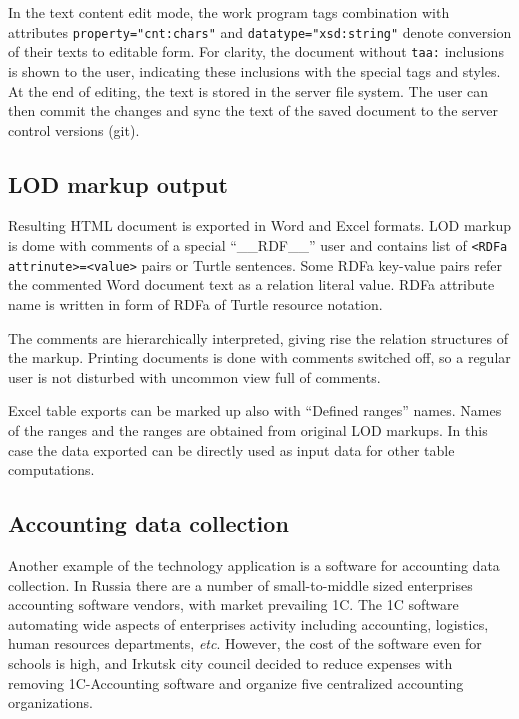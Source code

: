 \documentclass[conference,a4paper]{IEEEtran}
\begin{document}
In the text content edit mode, the work program tags combination with attributes \texttt{property="cnt:chars"} and \texttt{datatype="xsd:string"} denote conversion of their texts to editable form.  For clarity, the document without \texttt{taa:} inclusions is shown to the user, indicating these inclusions with the special tags and styles.  At the end of editing, the text is stored in the server file system.  The user can then commit the changes and sync the text of the saved document to the server control versions (git).

\subsection{LOD markup output}
\label{sec:lod-out}

Resulting HTML document is exported in Word and Excel formats.  LOD markup is dome with comments of a special ``\_\_RDF\_\_'' user and contains list of \texttt{<RDFa attrinute>=<value>} pairs or Turtle sentences.  Some RDFa key-value pairs refer the commented Word document text as a relation literal value.  RDFa attribute name is written in form of RDFa of Turtle resource notation.

The comments are hierarchically interpreted, giving rise the relation structures of the markup.  Printing documents is done with comments switched off, so a regular user is not disturbed with uncommon view full of comments.

Excel table exports can be marked up also with ``Defined ranges'' names.  Names of the ranges and the ranges are obtained from original LOD markups.  In this case the data exported can be directly used as input data for other table computations.

\subsection{Accounting data collection}
\label{sec:accounting}

Another example of the technology application is a software for accounting data collection.  In Russia there are a number of small-to-middle sized enterprises accounting software vendors, with market prevailing 1C.  The 1C software automating wide aspects of enterprises activity including accounting, logistics, human resources departments, \textit{etc}.  However, the cost of the software even for schools is high, and Irkutsk city council decided to reduce expenses with removing 1C-Accounting software and organize five centralized accounting organizations.
\end{document}
